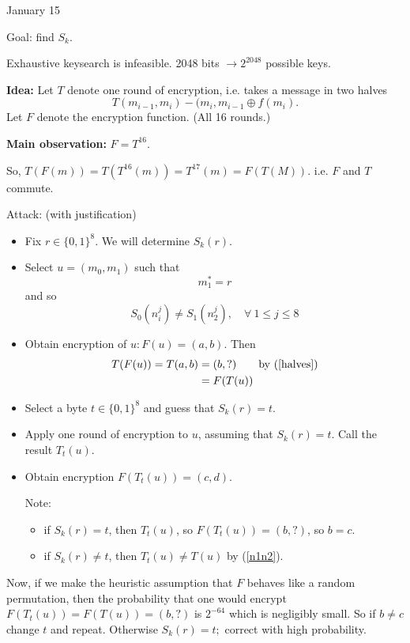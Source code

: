 \documentclass[a4paper,12pt]{article}
\begin{document}



\newcommand{\setn}{\ensuremath{\{0,1\}^n}}
\newcommand{\sets}{\ensuremath{\{0,1\}^*}}
\newcommand{\zps}{\ensuremath{\mathbb{Z}_p^*}}
\newcommand{\zp}{\ensuremath{\mathbb{Z}_p}}


 \hfill January 15

Goal: find $S_k$.

Exhaustive keysearch is infeasible.  2048 bits 
$\rightarrow2^{2048}$ possible keys.

{\bf Idea:}  Let $T$ denote one round of encryption, 
i.e. takes a message in two halves
\begin{equation}\label{halves}
T(m_{i-1},m_i) - (m_i,m_{i-1} \oplus f(m_i).
\end{equation}
Let $F$ denote the encryption function.  (All 16 rounds.)

{\bf Main observation:}
$F=T^{16}$.

So, $T(F(m)) = T(T^{16}(m)) = T^{17}(m) = F(T(M))$.
i.e. $F$ and $T$ commute.

Attack: (with justification)
\begin{itemize}
\item
Fix $r\in \{0,1\}^8.$  We will determine $S_k(r)$.

\item
Select $u=(m_0,m_1)$ such that 
\begin{equation}\label{m1r}
m_1^* = r 
\end{equation}
and so 
\begin{equation}\label{n1n2}
S_{0}(n_i^j)\ne S_1(n_2^j),\quad \forall\  1\le j \le 8 
\end{equation}

\item
Obtain encryption of $u: F(u)=(a,b)$.  Then
\begin{align*}
T(F(u)) = T(a,b) &= (b,?) \quad\quad \text{by (\ref{halves})}\\
&=F(T(u))
\end{align*}
\item
Select a byte $t\in\{0,1\}^8$ and guess that $S_k(r)=t$.
\item
Apply one round of encryption to $u$, assuming that $S_k(r)=t$.
Call the result $T_t(u)$.
\item
Obtain encryption $F(T_t(u))=(c,d)$.

Note:
\begin{itemize}
\renewcommand{\labelitemii}{$\circ$}
\item
if $S_k(r)=t$, then $T_t(u)$, so $F(T_t(u)) = (b,?)$, so $b=c$.
\item
if $S_k(r)\ne t$, then $T_t(u)\ne T(u)$ by (\ref{n1n2}).
\end{itemize}
\end{itemize}
Now, if we make the heuristic assumption that $F$ behaves like a random permutation, then the probability that one would encrypt $F(T_t(u)) = F(T(u)) = (b,?)$ is
$2^{-64}$ which is negligibly small.  So if $b\ne c$ change $t$ and repeat.  Otherwise $S_k(r)=t;$ correct with high probability.
\end{document}
